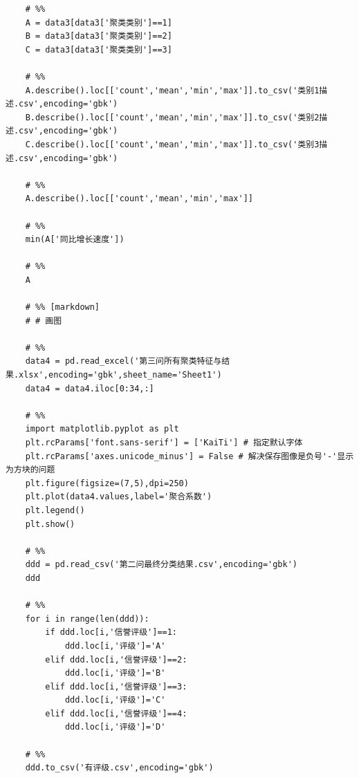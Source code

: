 \documentclass[UTF8]{ctexart}
\begin{document}
\begin{lstlisting}
	# %%
	A = data3[data3['聚类类别']==1]
	B = data3[data3['聚类类别']==2]
	C = data3[data3['聚类类别']==3]
	
	# %%
	A.describe().loc[['count','mean','min','max']].to_csv('类别1描述.csv',encoding='gbk')
	B.describe().loc[['count','mean','min','max']].to_csv('类别2描述.csv',encoding='gbk')
	C.describe().loc[['count','mean','min','max']].to_csv('类别3描述.csv',encoding='gbk')
	
	# %%
	A.describe().loc[['count','mean','min','max']]
	
	# %%
	min(A['同比增长速度'])
	
	# %%
	A
	
	# %% [markdown]
	# # 画图
	
	# %%
	data4 = pd.read_excel('第三问所有聚类特征与结果.xlsx',encoding='gbk',sheet_name='Sheet1')
	data4 = data4.iloc[0:34,:]
	
	# %%
	import matplotlib.pyplot as plt
	plt.rcParams['font.sans-serif'] = ['KaiTi'] # 指定默认字体
	plt.rcParams['axes.unicode_minus'] = False # 解决保存图像是负号'-'显示为方块的问题
	plt.figure(figsize=(7,5),dpi=250)
	plt.plot(data4.values,label='聚合系数')
	plt.legend()
	plt.show()
	
	# %%
	ddd = pd.read_csv('第二问最终分类结果.csv',encoding='gbk')
	ddd
	
	# %%
	for i in range(len(ddd)):
		if ddd.loc[i,'信誉评级']==1:
			ddd.loc[i,'评级']='A'
		elif ddd.loc[i,'信誉评级']==2:
			ddd.loc[i,'评级']='B'
		elif ddd.loc[i,'信誉评级']==3:
			ddd.loc[i,'评级']='C'
		elif ddd.loc[i,'信誉评级']==4:
			ddd.loc[i,'评级']='D'
	
	# %%
	ddd.to_csv('有评级.csv',encoding='gbk')
	
\end{lstlisting}
\end{document}
